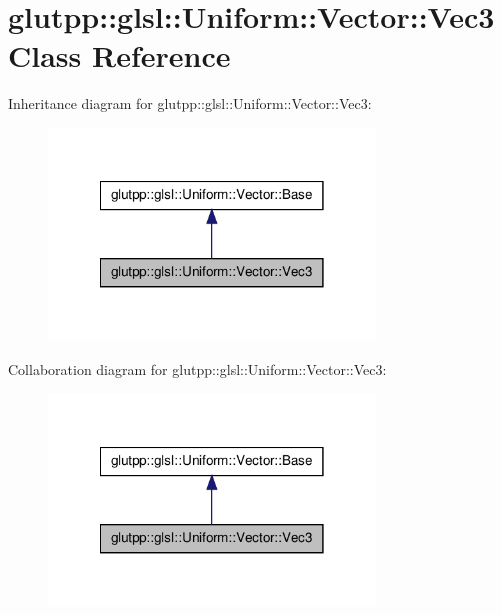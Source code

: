 \hypertarget{classglutpp_1_1glsl_1_1Uniform_1_1Vector_1_1Vec3}{\section{glutpp\-:\-:glsl\-:\-:\-Uniform\-:\-:\-Vector\-:\-:\-Vec3 \-Class \-Reference}
\label{classglutpp_1_1glsl_1_1Uniform_1_1Vector_1_1Vec3}
}


\-Inheritance diagram for glutpp\-:\-:glsl\-:\-:\-Uniform\-:\-:\-Vector\-:\-:\-Vec3\-:
\nopagebreak
\begin{figure}[H]
\begin{center}
\leavevmode
\includegraphics[width=246pt]{classglutpp_1_1glsl_1_1Uniform_1_1Vector_1_1Vec3__inherit__graph}
\end{center}
\end{figure}


\-Collaboration diagram for glutpp\-:\-:glsl\-:\-:\-Uniform\-:\-:\-Vector\-:\-:\-Vec3\-:
\nopagebreak
\begin{figure}[H]
\begin{center}
\leavevmode
\includegraphics[width=246pt]{classglutpp_1_1glsl_1_1Uniform_1_1Vector_1_1Vec3__coll__graph}
\end{center}
\end{figure}
